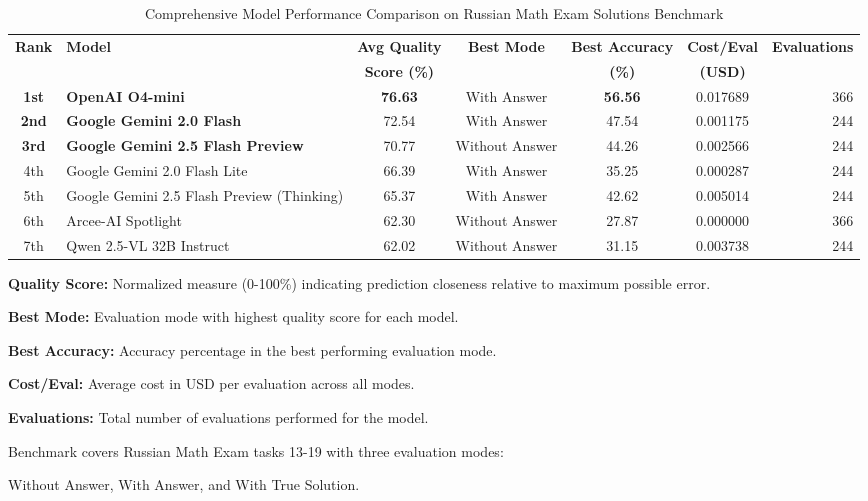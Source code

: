 
\begin{table}[htbp]
\centering
\caption{Comprehensive Model Performance Comparison on Russian Math Exam Solutions Benchmark}
\label{tab:model_comparison}
\begin{threeparttable}
\begin{tabular}{@{}clccccr@{}}
\toprule
\textbf{Rank} & \textbf{Model} & \textbf{Avg Quality} & \textbf{Best Mode} & \textbf{Best Accuracy} & \textbf{Cost/Eval} & \textbf{Evaluations} \\
& & \textbf{Score (\%)} & & \textbf{(\%)} & \textbf{(USD)} & \\
\midrule
\textbf{1st} & \textbf{OpenAI O4-mini} & \textbf{76.63} & With Answer & \textbf{56.56} & 0.017689 & 366 \\
\textbf{2nd} & \textbf{Google Gemini 2.0 Flash} & 72.54 & With Answer & 47.54 & 0.001175 & 244 \\
\textbf{3rd} & \textbf{Google Gemini 2.5 Flash Preview} & 70.77 & Without Answer & 44.26 & 0.002566 & 244 \\
\addlinespace
4th & Google Gemini 2.0 Flash Lite & 66.39 & With Answer & 35.25 & 0.000287 & 244 \\
5th & Google Gemini 2.5 Flash Preview (Thinking) & 65.37 & With Answer & 42.62 & 0.005014 & 244 \\
6th & Arcee-AI Spotlight & 62.30 & Without Answer & 27.87 & 0.000000 & 366 \\
7th & Qwen 2.5-VL 32B Instruct & 62.02 & Without Answer & 31.15 & 0.003738 & 244 \\
\bottomrule
\end{tabular}
\begin{tablenotes}
\small
\item \textbf{Quality Score:} Normalized measure (0-100\%) indicating prediction closeness relative to maximum possible error.
\item \textbf{Best Mode:} Evaluation mode with highest quality score for each model.
\item \textbf{Best Accuracy:} Accuracy percentage in the best performing evaluation mode.
\item \textbf{Cost/Eval:} Average cost in USD per evaluation across all modes.
\item \textbf{Evaluations:} Total number of evaluations performed for the model.
\item Benchmark covers Russian Math Exam tasks 13-19 with three evaluation modes:
\item \quad Without Answer, With Answer, and With True Solution.
\end{tablenotes}
\end{threeparttable}
\end{table}

